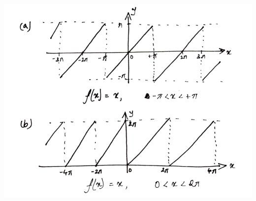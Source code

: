 \documentclass[10pt]{article}
\begin{document}
        \begin{center}
                \includegraphics[scale=0.4]{./6_10.png}
        \end{center}
\end{document}
